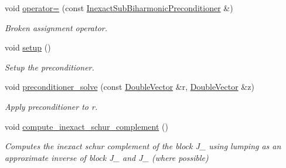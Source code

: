 \begin{DoxyCompactItemize}
void \hyperlink{classoomph_1_1InexactSubBiharmonicPreconditioner_ae4fea70f49be39011a6bc4f794188544}{operator=} (const \hyperlink{classoomph_1_1InexactSubBiharmonicPreconditioner}{Inexact\+Sub\+Biharmonic\+Preconditioner} \&)
\begin{DoxyCompactList}\small\item\em Broken assignment operator. \end{DoxyCompactList}\item 
void \hyperlink{classoomph_1_1InexactSubBiharmonicPreconditioner_aedc32eecdba45ee74777d340665ebdee}{setup} ()
\begin{DoxyCompactList}\small\item\em Setup the preconditioner. \end{DoxyCompactList}\item 
void \hyperlink{classoomph_1_1InexactSubBiharmonicPreconditioner_af15b753e7631a5f6de0bb33cebf37fad}{preconditioner\+\_\+solve} (const \hyperlink{classoomph_1_1DoubleVector}{Double\+Vector} \&r, \hyperlink{classoomph_1_1DoubleVector}{Double\+Vector} \&z)
\begin{DoxyCompactList}\small\item\em Apply preconditioner to r. \end{DoxyCompactList}\item 
void \hyperlink{classoomph_1_1InexactSubBiharmonicPreconditioner_a0ccbc50db6a0f30fb872d60a490cee64}{compute\+\_\+inexact\+\_\+schur\+\_\+complement} ()
\begin{DoxyCompactList}\small\item\em Computes the inexact schur complement of the block J\+\_ using lumping as an approximate inverse of block J\+\_ and J\+\_ (where possible) \end{DoxyCompactList}\end{DoxyCompactItemize}
